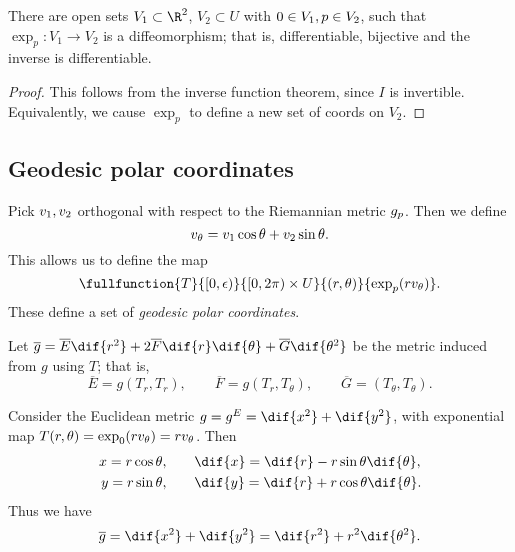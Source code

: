 \begin{corollary}
	There are open sets $V_1 \subset \R^2$, $V_2\subset U$ with $0\in V_1, p\in V_2$, such that $\exp_p:V_1 \to V_2$ is a diffeomorphism; that is, differentiable, bijective and the inverse is differentiable.
\end{corollary}

\begin{proof}
	This follows from the inverse function theorem, since $I$ is invertible. Equivalently, we cause $\exp_p$ to define a new set of coords on $V_2$.
\end{proof}


\subsection{Geodesic polar coordinates} %
\label{sub:geodesic_polar_coordinates}

Pick $v_1,v_2$ orthogonal with respect to the Riemannian metric $g_{p}$. Then we define
\begin{equation*}
	v_\theta = v_1 \cos\theta + v_2 \sin\theta.
\end{equation*}
This allows us to define the map
\begin{equation*}
	\fullfunction{T}{[0,\epsilon)}{[0,2\pi) \times U}{(r,\theta)}{\exp_p(r\vv_\theta)}.
\end{equation*}
These define a set of \emph{geodesic polar coordinates}.

Let $\overline{g} = \overline{E} \dif{r^2} + 2\overline{F} \dif{r}\dif{\theta} + \overline{G} \dif{\theta^2}$ be the metric induced from $g$ using $T$; that is,
\begin{equation*}
	\overline{E} = g(T_r,T_r),
	\qquad \overline{F} = g(T_r,T_\theta),
	\qquad \overline{G} = (T_\theta,T_\theta).
\end{equation*}

\begin{example}
	 Consider the Euclidean metric $g = g^E = \dif{x^2} + \dif{y^2}$, with exponential map $T(r,\theta) = \exp_0(rv_\theta) = rv_\theta$. Then
	 \begin{align*}
	 	x = r\cos\theta, & \qquad \dif{x} = \dif{r} - r\sin\theta \dif{\theta}, \\
	 	y = r\sin\theta, & \qquad \dif{y} = \dif{r} + r\cos\theta \dif{\theta}.
	 \end{align*}
	 Thus we have
	 \begin{equation*}
	 	\overline{g} = \dif{x^2} + \dif{y^2} = \dif{r^2} + r^2 \dif{\theta^2}.
	 \end{equation*}
\end{example}

